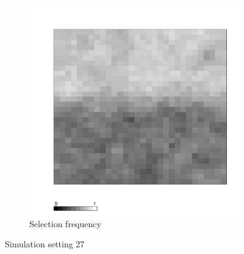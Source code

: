 \documentclass[authoryear, review, 11pt]{elsarticle}
\begin{document}
\begin{figure}
	\begin{subfigure}[b]{0.45\textwidth}
	\centering
		\includegraphics[width=\textwidth]{../../figures/simulation/X1.15.27.selection.pdf}
		\caption{Selection frequency}
	\end{subfigure}
	\caption{Simulation setting 27}
\end{figure}
\end{document}

